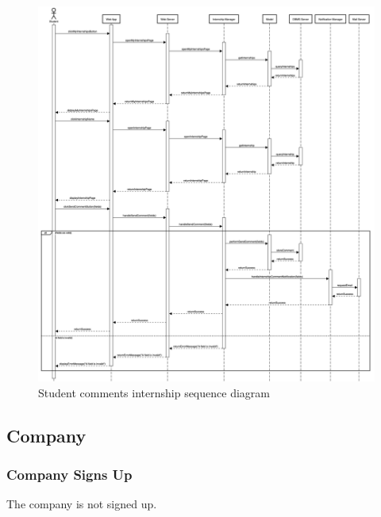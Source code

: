 \begin{figure}[h!]
    \centering
    \includegraphics[width=16cm]{images/sequence-diagrams/student-comments-internship.png}
    \caption{Student comments internship sequence diagram}
\end{figure}

\clearpage
\subsection{Company}
\subsubsection{Company Signs Up}
The company is not signed up. 

